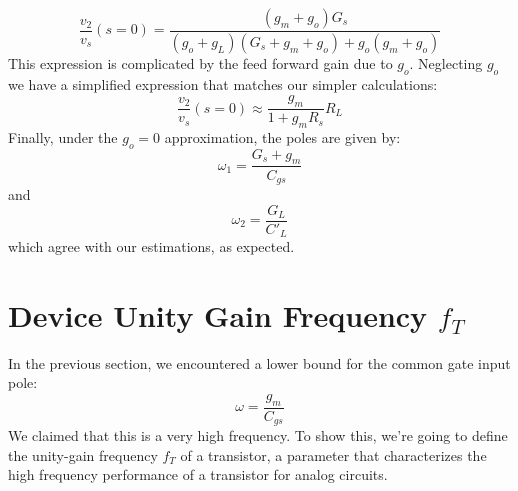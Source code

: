     \begin{equation}
        \frac{v_2}{v_s}(s = 0) = \frac{(g_m + g_o) G_s}{(g_o + g_L)(G_s + g_m + g_o) + g_o (g_m + g_o)} 
    \end{equation}
This expression is complicated by the feed forward gain due to $g_o$.  Neglecting $g_o$ we have a simplified expression that matches our simpler calculations:
    \begin{equation}
        \frac{v_2}{v_s}(s = 0) \approx \frac{g_m}{1 + g_m R_s} R_L 
    \end{equation}
Finally, under the $g_o = 0$ approximation, the poles are given by:
    \begin{equation}
        \omega_1 = \frac{G_s + g_m}{C_{gs}}
    \end{equation}
and
    \begin{equation}
        \omega_2 = \frac{G_L}{C'_{L}}
    \end{equation}
which agree with our estimations, as expected.
\newpage
\section{Device Unity Gain Frequency \texorpdfstring{$f_T$}{}}
In the previous section, we encountered a lower bound for the common gate input pole:
    \begin{equation}
        \omega = \frac{g_m}{C_{gs}}
    \end{equation}
We claimed that this is a very high frequency.  To show this, we're going to define the unity-gain frequency $f_T$ of a transistor, a parameter that characterizes the high frequency performance of a transistor for analog circuits.

